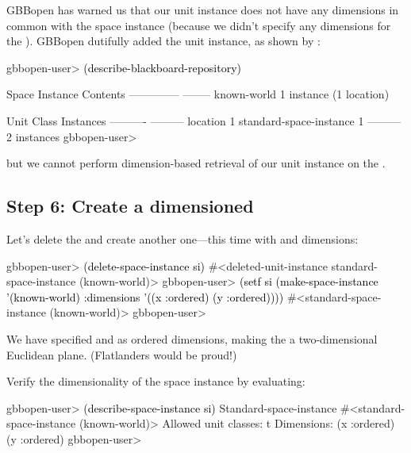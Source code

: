 \documentclass[10pt,twoside,english,pdftex]{article}
\begin{document}
%
GBBopen has warned us that our  unit instance does not
have any dimensions in common with the  space
instance (because we didn't specify any dimensions for the
).  GBBopen dutifully added the unit instance, as
shown by :
%
\W\supp
\begin{example}
\textcolor{darkergray}{%
  gbbopen-user> \textcolor{black}{(describe-blackboard-repository)}
  
  Space Instance                Contents
  --------------                --------
  known-world                   1 instance (1 location)

  Unit Class                    Instances
  ----------                    ---------
  location                              1
  standard-space-instance               1
                                ---------
                                        2 instances
  gbbopen-user>}
\end{example}
%
but we cannot perform dimension-based retrieval of our 
unit instance on the .

\subsection*{Step 6: Create a dimensioned }

%
%
%
Let's delete the  and create another one---this time
with  and  dimensions:
%
\W\supp
\begin{example}
\textcolor{darkergray}{%
  gbbopen-user> \textcolor{black}{(delete-space-instance si)}
  #<deleted-unit-instance standard-space-instance (known-world)>
  gbbopen-user> \textcolor{black}{(setf si (make-space-instance '(known-world)
              :dimensions '((x :ordered) (y :ordered))))}
  #<standard-space-instance (known-world)>
  gbbopen-user>}
\end{example}
%
We have specified  and  as ordered dimensions, making the
 a two-dimensional Euclidean plane.  (Flatlanders
would be proud!)

%
%
Verify the dimensionality of the  space instance by
evaluating:
%
\W\supp
\begin{example}
\textcolor{darkergray}{%
  gbbopen-user> \textcolor{black}{(describe-space-instance si)}
  Standard-space-instance #<standard-space-instance (known-world)>
    Allowed unit classes: t
    Dimensions:
      (x :ordered)
      (y :ordered)
  gbbopen-user>}
\end{example}
\end{document}
